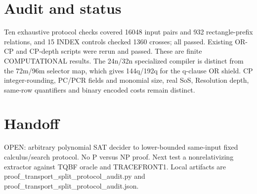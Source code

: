 \documentclass{article}
\begin{document}
\section{Audit and status}
Ten exhaustive protocol checks covered 16048 input pairs and 932 rectangle-prefix relations, and 15 INDEX controls checked 1360 crosses; all passed. Existing OR-CP and CP-depth scripts were rerun and passed. These are finite COMPUTATIONAL results. The 24n/32n specialized compiler is distinct from the 72m/96m selector map, which gives 144q/192q for the q-clause OR shield. CP integer-rounding, PC/PCR fields and monomial size, real SoS, Resolution depth, same-row quantifiers and binary encoded costs remain distinct.
\section{Handoff}
OPEN: arbitrary polynomial SAT decider to lower-bounded same-input fixed calculus/search protocol. No P versus NP proof. Next test a nonrelativizing extractor against TQBF oracle and TRACEFRONT1. Local artifacts are proof_transport_split_protocol_audit.py and proof_transport_split_protocol_audit.json.
\end{document}
